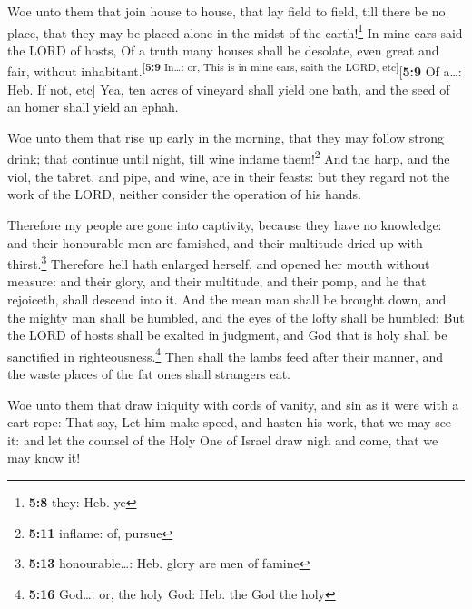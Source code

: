  Woe unto them that join house to house, that lay field to
field, till there be no place, that they may be placed alone in the
midst of the earth!\footnote{\textbf{5:8} they: Heb. ye} 
In mine ears said the LORD of hosts, Of a truth many houses shall be
desolate, even great and fair, without
inhabitant.\textsuperscript{{[}\textbf{5:9} In\ldots: or, This is in
mine ears, saith the LORD, etc{]}}{[}\textbf{5:9} Of a\ldots: Heb. If
not, etc{]}  Yea, ten acres of vineyard shall yield one
bath, and the seed of an homer shall yield an ephah.

 Woe unto them that rise up early in the morning, that
they may follow strong drink; that continue until night, till wine
inflame them!\footnote{\textbf{5:11} inflame: of, pursue}
 And the harp, and the viol, the tabret, and pipe, and
wine, are in their feasts: but they regard not the work of the LORD,
neither consider the operation of his hands.

 Therefore my people are gone into captivity, because
they have no knowledge: and their honourable men are famished, and their
multitude dried up with thirst.\footnote{\textbf{5:13} honourable\ldots:
  Heb. glory are men of famine}  Therefore hell hath
enlarged herself, and opened her mouth without measure: and their glory,
and their multitude, and their pomp, and he that rejoiceth, shall
descend into it.  And the mean man shall be brought down,
and the mighty man shall be humbled, and the eyes of the lofty shall be
humbled:  But the LORD of hosts shall be exalted in
judgment, and God that is holy shall be sanctified in
righteousness.\footnote{\textbf{5:16} God\ldots: or, the holy God: Heb.
  the God the holy}  Then shall the lambs feed after
their manner, and the waste places of the fat ones shall strangers eat.

 Woe unto them that draw iniquity with cords of vanity,
and sin as it were with a cart rope:  That say, Let him
make speed, and hasten his work, that we may see it: and let the counsel
of the Holy One of Israel draw nigh and come, that we may know it!

